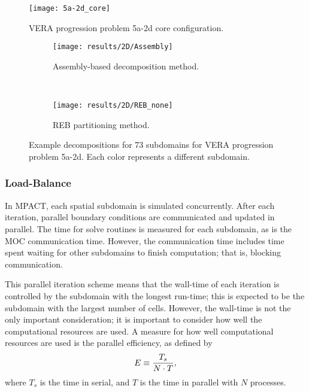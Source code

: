 {{{      \begin{figure}
        \centering
        \texttt{[image: 5a-2d\_core]}
        \caption{VERA progression problem 5a-2d core configuration. \label{fig:Spatial Decomposition:5a-2d}}
      \end{figure}

      \begin{figure}[H]
        \centering
        \begin{subfigure}[t]{0.45\textwidth}
          \centering
          \texttt{[image: results/2D/Assembly]}
          \caption{Assembly-based decomposition method. \label{fig:Spatial Decomposition:5a-2d 73 Assembly}}
        \end{subfigure}%
        ~
        \begin{subfigure}[t]{0.45\textwidth}
          \centering
          \texttt{[image: results/2D/REB\_none]}
          \caption{\ac{REB} partitioning method. \label{fig:Spatial Decomposition:5a-2d 73 REB None}}
        \end{subfigure}
        \caption{
          Example decompositions for 73 subdomains for VERA progression problem 5a-2d.
          Each color represents a different subdomain.
          \label{fig:Spatial Decomposition:5a-2d example decomp}
        }
      \end{figure}

      \subsubsection{Load-Balance}{\label{sssec:Spatial Decomposition:Load-Balance}
        In MPACT, each spatial subdomain is simulated concurrently.
        After each iteration, parallel boundary conditions are communicated and updated in parallel.
        The time for solve routines is measured for each subdomain, as is the \ac{MOC} communication time.
        However, the communication time includes time spent waiting for other subdomains to finish computation; that is, blocking communication.

        This parallel iteration scheme means that the wall-time of each iteration is controlled by the subdomain with the longest run-time; this is expected to be the subdomain with the largest number of cells.
        However, the wall-time is not the only important consideration; it is important to consider how well the computational resources are used.
        A measure for how well computational resources are used is the parallel efficiency, as defined by
        \begin{equation}
            \label{eq:Spatial Decomposition:Parallel Efficiency}
            E \equiv \frac{T_s}{N \cdot T},
        \end{equation}
        where $T_s$ is the time in serial, and $T$ is the time in parallel with $N$ processes.

}}}}

